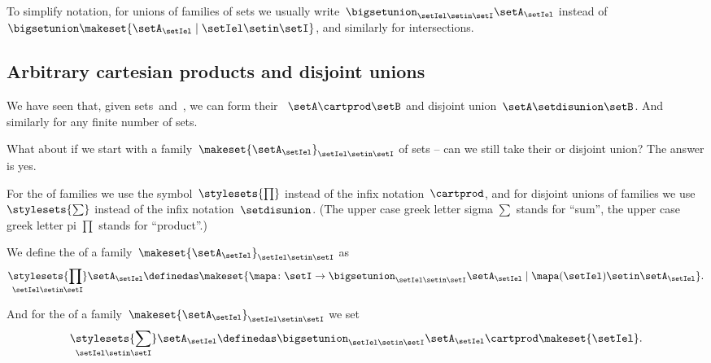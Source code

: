 \begin{remark}
    To simplify notation, for unions of families of sets we usually write~$\bigsetunion_{\setIel\setin \setI} \setA_\setIel$ instead of~$\bigsetunion \makeset{ \setA_\setIel \mid \setIel \setin\setI }$, and similarly for intersections.
\end{remark}

\subsection{Arbitrary cartesian products and disjoint unions}

We have seen that, given sets~\setA and~\setB, we can form their ~$\setA \cartprod \setB$ and disjoint union~$\setA \setdisunion \setB$.
And similarly for any finite number of sets.

What about if we start with a family~$\makeset{ \setA_\setIel }_{\setIel \setin\setI}$ of sets -- can we still take their  or disjoint union?
The answer is yes.

For the  of families we use the symbol~$\stylesets{\prod}$ instead of the infix notation~$\cartprod$, and for disjoint unions of families we use~$\stylesets{\sum}$ instead of the infix notation~$\setdisunion$.
(The upper case greek letter sigma $\sum$ stands for ``sum'', the upper case greek letter pi $\prod$ stands for ``product''.)

We define the  of a family~$\makeset{ \setA_{\setIel} }_{\setIel \setin\setI}$ as
\begin{equation}
    \underset{\setIel \setin\setI}{\stylesets{\prod}} \setA_{\setIel} \definedas \makeset{ \mapa \colon \setI \to \bigsetunion_{\setIel \setin\setI } \setA_{\setIel} \mid \mapa(\setIel) \setin\setA_{\setIel}}.
\end{equation}

And for the  of a family~$\makeset{ \setA_{\setIel} }_{\setIel \setin\setI}$ we set
\begin{equation}
    \underset{\setIel \setin\setI}{\stylesets{\sum}} \setA_{\setIel} \definedas \bigsetunion_{\setIel \setin\setI} \setA_{\setIel} \cartprod \makeset{ \setIel }.
\end{equation}

